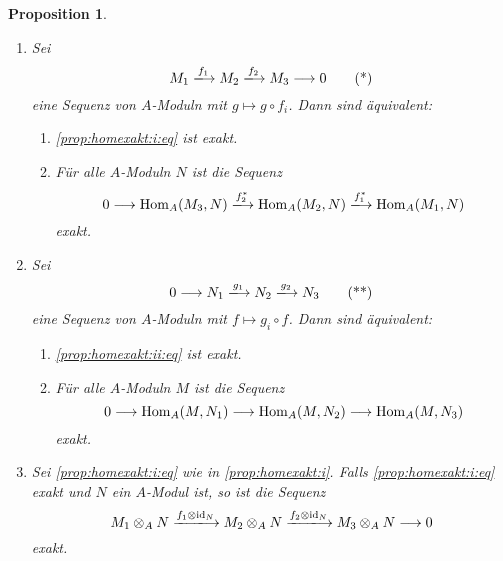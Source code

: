 \documentclass[12pt,a4paper]{scrartcl}
\theoremstyle{cplain}
\newtheorem{prop}[thmcounter]{Proposition}
\theoremstyle{cdef}
\begin{document}
\begin{prop} \label{prop:exaktheit tensorieren}
	\leavevmode
	\begin{enumerate}
		\item Sei
		\begin{equation}
			M_1 \xlongrightarrow{f_1} M_2 \xlongrightarrow{f_2} M_3 \longrightarrow 0 \tag{*} \label{prop:homexakt:i:eq}
		\end{equation}
		eine Sequenz von $A$-Moduln mit $g \mapsto g \circ f_i$. Dann sind äquivalent:
		\begin{enumerate}
			\item \eqref{prop:homexakt:i:eq} ist exakt.
			\item Für alle $A$-Moduln $N$ ist die Sequenz \[ 0 \longrightarrow \Hom_A(M_3, N) \xlongrightarrow{f_2^*} \Hom_A(M_2,N) \xlongrightarrow{f_1^*} \Hom_A(M_1,N) \] exakt.
		\end{enumerate} \label{prop:homexakt:i}
		\item Sei
		\begin{equation}
			0 \longrightarrow N_1 \xlongrightarrow{g_1} N_2 \xlongrightarrow{g_2} N_3 \tag{**} \label{prop:homexakt:ii:eq}
		\end{equation}
		eine Sequenz von $A$-Moduln mit $f \mapsto g_i \circ f$. Dann sind äquivalent:
		\begin{enumerate}
			\item \eqref{prop:homexakt:ii:eq} ist exakt.
			\item Für alle $A$-Moduln $M$ ist die Sequenz \[ 0 \longrightarrow \operatorname{Hom}_A(M, N_1) \longrightarrow \operatorname{Hom}_A(M,N_2) \longrightarrow \operatorname{Hom}_A(M,N_3) \] exakt.
		\end{enumerate} \label{prop:homexakt:ii}
		\item Sei \eqref{prop:homexakt:i:eq} wie in \ref{prop:homexakt:i}. Falls \eqref{prop:homexakt:i:eq} exakt und $N$ ein $A$-Modul ist, so ist die Sequenz \[ M_1 \tp_A N \xlongrightarrow{f_1 \tp \id_N} M_2 \tp_A N \xlongrightarrow{f_2 \tp \id_N} M_3 \tp_A N \longrightarrow 0 \] exakt. \label{prop:homexakt:iii}
	\end{enumerate}
\end{prop}
\end{document}
